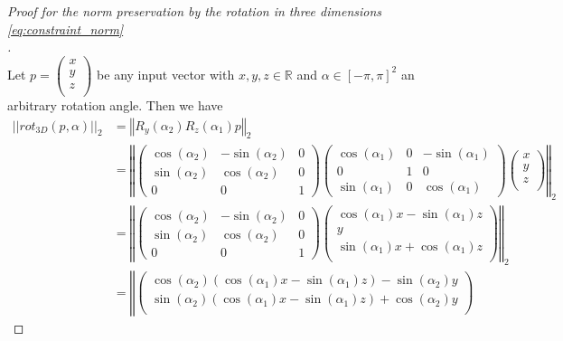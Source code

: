 \begin{proof}[Proof for the norm preservation by the rotation in three dimensions \eqref{eq:constraint_norm}\\]$\,$\\
	Let $p = \begin{pmatrix}x \\y \\z \\\end{pmatrix}$ be any input vector with $x, y, z \in \mathbb{R}$ and $\alpha \in [-\pi, \pi]^2$ an arbitrary rotation angle. Then we have
	\begin{equation}
	\label{proof:norm_preservation_dim3}
	\begin{aligned}
	||rot_{3D}(p, \alpha)||_2 &= \left\Vert R_{y}(\alpha_2) R_{z}(\alpha_1) p \right\Vert_2 \\
	&= \left\Vert \begin{pmatrix} \cos(\alpha_2) & -\sin(\alpha_2) & 0\\\sin(\alpha_2) & \cos(\alpha_2) & 0\\ 0 & 0 & 1\end{pmatrix} \begin{pmatrix} \cos(\alpha_1) & 0 & -\sin(\alpha_1)\\ 0 & 1 & 0\\\sin(\alpha_1) & 0 & \cos(\alpha_1)\end{pmatrix} \begin{pmatrix}x \\y \\z \\\end{pmatrix} \right\Vert_2 \\
	&= \left\Vert \begin{pmatrix} \cos(\alpha_2) & -\sin(\alpha_2) & 0\\\sin(\alpha_2) & \cos(\alpha_2) & 0\\ 0 & 0 & 1\end{pmatrix} \begin{pmatrix}\cos(\alpha_1)x - \sin(\alpha_1)z \\y \\\sin(\alpha_1)x + \cos(\alpha_1)z \\\end{pmatrix} \right\Vert_2 \\
	&= \left\Vert \begin{pmatrix}\cos(\alpha_2)(\cos(\alpha_1)x - \sin(\alpha_1)z) - \sin(\alpha_2)y \\
	\sin(\alpha_2)(\cos(\alpha_1)x - \sin(\alpha_1)z) + \cos(\alpha_2)y \\

\end{pmatrix}
\end{aligned}
\end{equation}
\end{proof}
